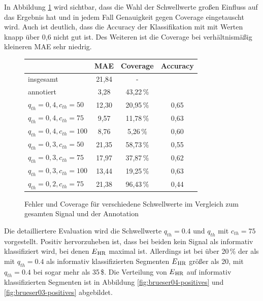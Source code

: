 In Abbildung \ref{fig:brueser-sqi-MAE-Coverage} wird sichtbar, dass die Wahl der Schwellwerte großen Einfluss auf das Ergebnis hat und in jedem Fall Genauigkeit gegen Coverage eingetauscht wird. Auch ist deutlich, dass die Accuracy der Klassifikation mit mit Werten knapp über 0{,}6 nicht gut ist. Des Weiteren ist die Coverage bei verhältnismäßig kleineren \ac{MAE} sehr niedrig.
 
  \begin{figure}[H]
 	\centering
 	\begin{tabular}{l || c | c | c}
 									& \ac{MAE}	& Coverage		& Accuracy\\ \hline
 		insgesamt 					& 21{,}84	& -				& \\
 		annotiert					& 3{,}28		& 43{,}22\,\%	& \\ \hline
 		$q_{th}=0{,}4, c_{th}=50$	& 12{,}30	& 20{,}95\,\%	& 0{,}65\\
 		$q_{th}=0{,}4, c_{th}=75$	& 9{,}57		& 11{,}78\,\%	& 0{,}63\\
 		$q_{th}=0{,}4, c_{th}=100$	& 8{,}76	& 5{,}26\,\%		& 0{,}60\\ \hline
 		$q_{th}=0{,}3, c_{th}=50$	& 21{,}35	& 58{,}73\,\%	& 0{,}55\\
 		$q_{th}=0{,}3, c_{th}=75$	& 17{,}97	& 37{,}87\,\%	& 0{,}62\\
 		$q_{th}=0{,}3, c_{th}=100$	& 13{,}44	& 19{,}25\,\%	& 0{,}63\\ \hline
 		$q_{th}=0{,}2, c_{th}=75$	& 21{,}38	& 96{,}43\,\%	& 0{,}44\\
 	\end{tabular}
 	\caption[Fehler und Coverage der Klassifikation nach der Ähnlichkeit der Intervallschätzer des CLIE-Algorithmus für verschiedene Schwellwerte im Vergleich zum gesamten Signal und der Annotation]{Fehler und Coverage für verschiedene Schwellwerte im Vergleich zum gesamten Signal und der Annotation}
 	\label{fig:brueser-sqi-MAE-Coverage}
 	\end{figure}
 	
 Die detailliertere Evaluation wird die Schwellwerte $q_{th} = 0.4$ und $q_{th}$ mit $c_{th}=75$ vorgestellt. Positiv hervorzuheben ist, dass bei beiden kein Signal als informativ klassifiziert wird, bei denen $E\textsubscript{HR}$ maximal ist. Allerdings ist bei über 20\,\% der als mit $q_{th} = 0.4$ als informativ klassifizierten Segmenten $E\textsubscript{HR}$ größer als 20, mit $q_{th} = 0.4$ bei sogar mehr als 35\,\$. Die Verteilung von $E\textsubscript{HR}$ auf informativ klassifizierten Segmenten ist in Abbildung \ref{fig:brueser04-positives} und \ref{fig:brueser03-positives} abgebildet.
 
